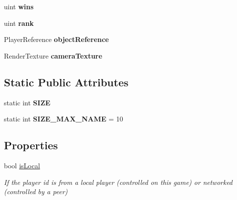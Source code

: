 \begin{DoxyCompactItemize}
\item 
\hypertarget{struct_game_state_1_1_player_a3a4d13459cad9bd58e058ddc6387af70}{uint {\bfseries wins}}\label{struct_game_state_1_1_player_a3a4d13459cad9bd58e058ddc6387af70}

\item 
\hypertarget{struct_game_state_1_1_player_a6cf0778cc27a824eac211b8b29b3dfcc}{uint {\bfseries rank}}\label{struct_game_state_1_1_player_a6cf0778cc27a824eac211b8b29b3dfcc}

\item 
\hypertarget{struct_game_state_1_1_player_aebf24de01e14055dc940d0493753484f}{Player\-Reference {\bfseries object\-Reference}}\label{struct_game_state_1_1_player_aebf24de01e14055dc940d0493753484f}

\item 
\hypertarget{struct_game_state_1_1_player_ac1f7e0b5bc335c32c3be71e3653787a6}{Render\-Texture {\bfseries camera\-Texture}}\label{struct_game_state_1_1_player_ac1f7e0b5bc335c32c3be71e3653787a6}

\end{DoxyCompactItemize}
\subsection*{Static Public Attributes}
\begin{DoxyCompactItemize}
\item 
static int {\bfseries S\-I\-Z\-E}
\item 
\hypertarget{struct_game_state_1_1_player_a1cdc9de8183b220e87632f7f6a7147d0}{static int {\bfseries S\-I\-Z\-E\-\_\-\-M\-A\-X\-\_\-\-N\-A\-M\-E} = 10}\label{struct_game_state_1_1_player_a1cdc9de8183b220e87632f7f6a7147d0}

\end{DoxyCompactItemize}
\subsection*{Properties}
\begin{DoxyCompactItemize}
\item 
bool \hyperlink{struct_game_state_1_1_player_affd7c601a6d763dafdc59a58c415e9e7}{is\-Local}
\begin{DoxyCompactList}\small\item\em If the player id is from a local player (controlled on this game) or networked (controlled by a peer) \end{DoxyCompactList}\end{DoxyCompactItemize}


